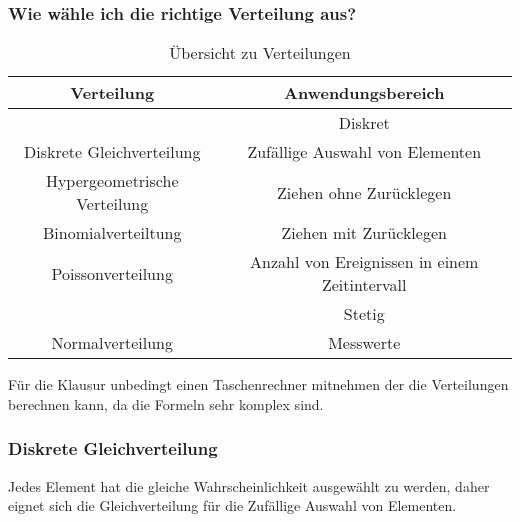 \documentclass[12pt]{scrartcl}
\begin{document}
\subsubsection{Wie wähle ich die richtige Verteilung aus?}

\begin{table}[h]
    \begin{tabular}{ | c | c | }
        \hline
        Verteilung                   & Anwendungsbereich                             \\
        \hline
        \hline
                                     & Diskret                                       \\
        \hline
        Diskrete Gleichverteilung    & Zufällige Auswahl von Elementen               \\
        \hline
        Hypergeometrische Verteilung & Ziehen ohne Zurücklegen                       \\
        \hline
        Binomialverteiltung          & Ziehen mit Zurücklegen                        \\
        \hline
        Poissonverteilung            & Anzahl von Ereignissen in einem Zeitintervall \\
        \hline
        \hline
                                     & Stetig                                        \\
        \hline
        Normalverteilung             & Messwerte                                     \\
        \hline
    \end{tabular}
    \caption{Übersicht zu Verteilungen}
\end{table}

Für die Klausur unbedingt einen Taschenrechner mitnehmen der die Verteilungen berechnen kann,
da die Formeln sehr komplex sind.

\subsubsection{Diskrete Gleichverteilung}

Jedes Element hat die gleiche Wahrscheinlichkeit ausgewählt zu werden,
daher eignet sich die Gleichverteilung für die Zufällige Auswahl von Elementen.
\end{document}
